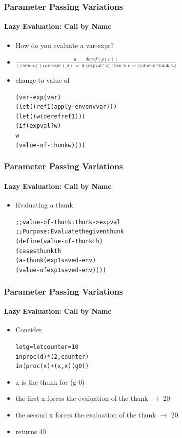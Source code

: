 \documentclass{beamer}
\newcommand{\arrow}{\(\rightarrow\)}
\begin{document}
\begin{frame}[fragile]
\frametitle{Parameter Passing Variations}
\framesubtitle{Lazy Evaluation: Call by Name}
\begin{scriptsize}
\begin{itemize}
\item<1-> How do you evaluate a var-expr?

\item<2->
$\frac{w \ = \ deref(\rho(v))}{(value\text{-}of \ (var\text{-}exp v) \ \rho) \ = \ \textrm{if (expval? w) then w else  (value-of-thunk w)}
}$

\item<3-> change to value-of
\begin{alltt}
(var-exp (var)
  (let ((ref1 (apply-env env var)))
    (let ((w (deref ref1)))
      (if (expval? w)
          w					
		  (value-of-thunk w))))
\end{alltt}

\end{itemize}
\end{scriptsize}
\end{frame}

\begin{frame}[fragile]
\frametitle{Parameter Passing Variations}
\framesubtitle{Lazy Evaluation: Call by Name}
\begin{scriptsize}
\begin{itemize}

\item<1-> Evaluating a thunk
\begin{alltt}
;; value-of-thunk : thunk -> expval
;; Purpose: Evaluate the given thunk
(define (value-of-thunk th)
  (cases thunk th
    (a-thunk (exp1 saved-env)
             (value-of exp1 saved-env))))
\end{alltt}

\end{itemize}
\end{scriptsize}
\end{frame}

\begin{frame}[fragile]
\frametitle{Parameter Passing Variations}
\framesubtitle{Lazy Evaluation: Call by Name}
\begin{scriptsize}
\begin{itemize}
\item<1-> Consider
\begin{alltt}
let g = let counter = 10
            in proc (d) *(2, counter)
in (proc (x) +(x, x) (g 0))
\end{alltt}

\item<2-> x is the thunk for (g 0)

\item<3-> the first x forces the evaluation of the thunk \arrow{} 20

\item<4-> the second x forces the evaluation of the thunk \arrow{} 20

\item<4-> returns 40
\end{itemize}
\end{scriptsize}
\end{frame}
\end{document}
